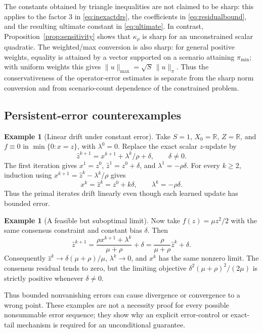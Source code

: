 \documentclass[preprint,12pt,3p]{elsarticle}
\theoremstyle{definition}
\newtheorem{example}[theorem]{Example}
\begin{document}
The constants obtained by triangle inequalities are not claimed to be sharp: this applies to the factor $3$ in \eqref{eq:inexactdrs}, the coefficients in \eqref{eq:residualbound}, and the resulting ultimate constant in \eqref{eq:ultimate}. In contrast, Proposition~\ref{prop:sensitivity} shows that $\kappa_\rho$ is sharp for an unconstrained scalar quadratic. The weighted/max conversion is also sharp: for general positive weights, equality is attained by a vector supported on a scenario attaining $\pi_{\min}$; with uniform weights this gives $\|u\|_{\max}=\sqrt S\,\|u\|_\pi$. Thus the conservativeness of the operator-error estimates is separate from the sharp norm conversion and from scenario-count dependence of the constrained problem.

\subsection{Persistent-error counterexamples}
\begin{example}[Linear drift under constant error]\label{ex:drift}
Take $S=1$, $X_0=\mathbb R$, $Z=\mathbb R$, and $f\equiv0$ in $\min\{0:x=z\}$, with $\lambda^0=0$. Replace the exact scalar $z$-update by
\[
\widehat z^{k+1}=x^{k+1}+\lambda^k/\rho+\delta,\qquad\delta\ne0.
\]
The first iteration gives $x^1=z^0$, $\widehat z^1=z^0+\delta$, and $\lambda^1=-\rho\delta$. For every $k\geq2$, induction using $x^{k+1}=\widehat z^k-\lambda^k/\rho$ gives
\[
x^k=\widehat z^k=z^0+k\delta,\qquad\lambda^k=-\rho\delta.
\]
Thus the primal iterates drift linearly even though each learned update has bounded error.
\end{example}
\begin{example}[A feasible but suboptimal limit]\label{ex:suboptimal}
Now take $f(z)=\mu z^2/2$ with the same consensus constraint and constant bias $\delta$. Then
\[
\widehat z^{k+1}=\frac{\rho x^{k+1}+\lambda^k}{\mu+\rho}+\delta
=\frac{\rho}{\mu+\rho}\widehat z^k+\delta.
\]
Consequently $\widehat z^k\to\delta(\mu+\rho)/\mu$, $\lambda^k\to0$, and $x^k$ has the same nonzero limit. The consensus residual tends to zero, but the limiting objective $\delta^2(\mu+\rho)^2/(2\mu)$ is strictly positive whenever $\delta\ne0$.
\end{example}
Thus bounded nonvanishing errors can cause divergence or convergence to a wrong point. These examples are not a necessity proof for every possible nonsummable error sequence; they show why an explicit error-control or exact-tail mechanism is required for an unconditional guarantee.
\end{document}
